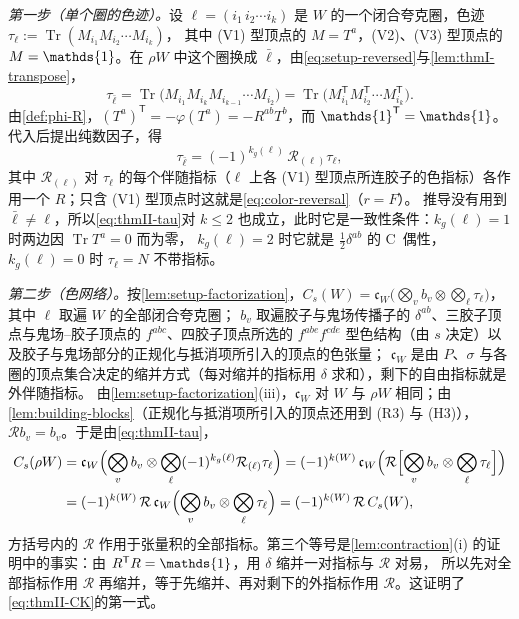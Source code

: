 \documentclass[UTF8,a4paper,11pt,fontset=fandol]{ctexart}
\makeatletter
\let\amsmathbb\mathbb
\renewcommand{\mathbb}[1]{\ifx1#1\mathds{1}\else\amsmathbb{#1}\fi}
\theoremstyle{cplain}
\theoremstyle{cdefinition}
\theoremstyle{cremark}
\renewcommand{\proofname}{证明}
\renewenvironment{proof}[1][\proofname]{\par\pushQED{\qed}\normalfont\topsep6\p@\@plus6\p@\relax
  \trivlist\item[\hskip\labelsep\itshape #1\hspace{0.5em}]\ignorespaces}{\popQED\endtrivlist\@endpefalse}
\numberwithin{equation}{section}
\DeclareMathOperator{\Tr}{Tr}
\newcommand{\tp}{\mathsf{T}}                         %
\newcommand{\Rop}{\mathcal{R}}                       %
\makeatother
\begin{document}
\begin{proof}
\emph{第一步（单个圈的色迹）。}设 $\ell=(i_1\,i_2\cdots i_k)$ 是 $W$ 的一个闭合夸克圈，色迹 $\tau_\ell:=\Tr(M_{i_1}M_{i_2}\cdots M_{i_k})$，
其中 (V1) 型顶点的 $M=T^a$，(V2)、(V3) 型顶点的 $M=\mathbb 1$。在 $\rho W$ 中这个圈换成 $\bar\ell$，由\cref{eq:setup-reversed}与\cref{lem:thmI-transpose}，
\[
\tau_{\bar\ell}=\Tr\bigl(M_{i_1}M_{i_k}M_{i_{k-1}}\cdots M_{i_2}\bigr)=\Tr\bigl(M_{i_1}^{\tp}M_{i_2}^{\tp}\cdots M_{i_k}^{\tp}\bigr).
\]
由\cref{def:phi-R}，$(T^a)^{\tp}=-\varphi(T^a)=-R^{ab}T^b$，而 $\mathbb 1^{\tp}=\mathbb 1$。代入后提出纯数因子，得
\begin{equation}\label{eq:thmII-tau}
\tau_{\bar\ell}=(-1)^{k_g(\ell)}\,\Rop_{(\ell)}\tau_\ell ,
\end{equation}
其中 $\Rop_{(\ell)}$ 对 $\tau_\ell$ 的每个伴随指标（$\ell$ 上各 (V1) 型顶点所连胶子的色指标）各作用一个 $R$；只含 (V1) 型顶点时这就是\cref{eq:color-reversal}（$r=F$）。
推导没有用到 $\bar\ell\neq\ell$，所以\cref{eq:thmII-tau}对 $k\le2$ 也成立，此时它是一致性条件：$k_g(\ell)=1$ 时两边因 $\Tr T^a=0$ 而为零，
$k_g(\ell)=2$ 时它就是 $\frac12\delta^{ab}$ 的 C~偶性，$k_g(\ell)=0$ 时 $\tau_\ell=N$ 不带指标。

\emph{第二步（色网络）。}按\cref{lem:setup-factorization}，$C_s(W)=\mathfrak c_W\bigl(\bigotimes_vb_v\otimes\bigotimes_\ell\tau_\ell\bigr)$，其中 $\ell$ 取遍 $W$ 的全部闭合夸克圈；
$b_v$ 取遍胶子与鬼场传播子的 $\delta^{ab}$、三胶子顶点与鬼场--胶子顶点的 $f^{abc}$、四胶子顶点所选的 $f^{abe}f^{cde}$ 型色结构（由 $s$ 决定）以及胶子与鬼场部分的正规化与抵消项所引入的顶点的色张量；
$\mathfrak c_W$ 是由 $P$、$\sigma$ 与各圈的顶点集合决定的缩并方式（每对缩并的指标用 $\delta$ 求和），剩下的自由指标就是外伴随指标。
由\cref{lem:setup-factorization}(iii)，$\mathfrak c_W$ 对 $W$ 与 $\rho W$ 相同；由\cref{lem:building-blocks}（正规化与抵消项所引入的顶点还用到 (R3) 与 (H3)），$\Rop b_v=b_v$。于是由\cref{eq:thmII-tau}，
\begin{align*}
C_s(\rho W)&=\mathfrak c_W\Bigl(\bigotimes_vb_v\otimes\bigotimes_\ell(-1)^{k_g(\ell)}\Rop_{(\ell)}\tau_\ell\Bigr)
=(-1)^{k(W)}\,\mathfrak c_W\Bigl(\Rop\Bigl[\bigotimes_vb_v\otimes\bigotimes_\ell\tau_\ell\Bigr]\Bigr)\\
&=(-1)^{k(W)}\,\Rop\,\mathfrak c_W\Bigl(\bigotimes_vb_v\otimes\bigotimes_\ell\tau_\ell\Bigr)=(-1)^{k(W)}\,\Rop\,C_s(W),
\end{align*}
方括号内的 $\Rop$ 作用于张量积的全部指标。第三个等号是\cref{lem:contraction}(i) 的证明中的事实：由 $R^{\tp}R=\mathbb 1$，用 $\delta$ 缩并一对指标与 $\Rop$ 对易，
所以先对全部指标作用 $\Rop$ 再缩并，等于先缩并、再对剩下的外指标作用 $\Rop$。这证明了\cref{eq:thmII-CK}的第一式。


\end{proof}
\end{document}
